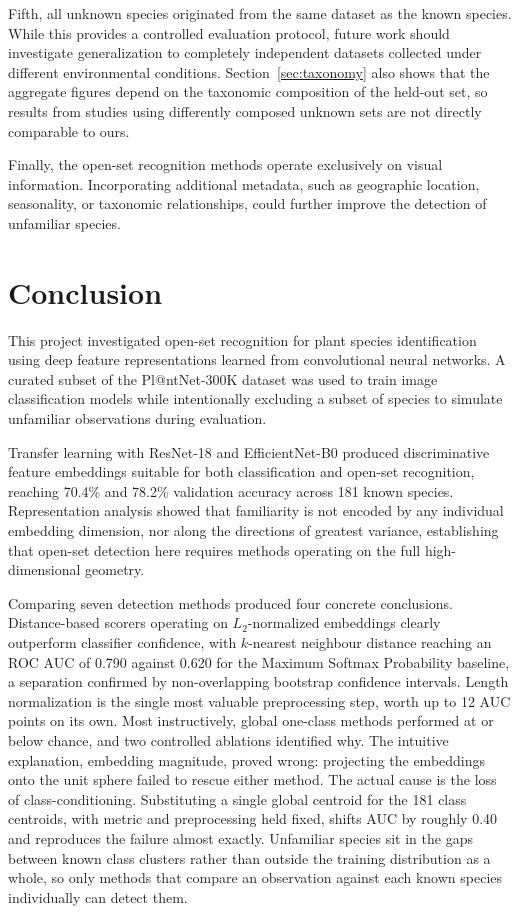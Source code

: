 \documentclass[11pt]{article}
\begin{document}
Fifth, all unknown species originated from the same dataset as the known species. While this provides a controlled evaluation protocol, future work should investigate generalization to completely independent datasets collected under different environmental conditions. Section~\ref{sec:taxonomy} also shows that the aggregate figures depend on the taxonomic composition of the held-out set, so results from studies using differently composed unknown sets are not directly comparable to ours.

Finally, the open-set recognition methods operate exclusively on visual information. Incorporating additional metadata, such as geographic location, seasonality, or taxonomic relationships, could further improve the detection of unfamiliar species.

\section{Conclusion}


This project investigated open-set recognition for plant species identification using deep feature representations learned from convolutional neural networks. A curated subset of the Pl@ntNet-300K dataset was used to train image classification models while intentionally excluding a subset of species to simulate unfamiliar observations during evaluation.

Transfer learning with ResNet-18 and EfficientNet-B0 produced discriminative feature embeddings suitable for both classification and open-set recognition, reaching 70.4\% and 78.2\% validation accuracy across 181 known species. Representation analysis showed that familiarity is not encoded by any individual embedding dimension, nor along the directions of greatest variance, establishing that open-set detection here requires methods operating on the full high-dimensional geometry.

Comparing seven detection methods produced four concrete conclusions. Distance-based scorers operating on $L_2$-normalized embeddings clearly outperform classifier confidence, with $k$-nearest neighbour distance reaching an ROC AUC of 0.790 against 0.620 for the Maximum Softmax Probability baseline, a separation confirmed by non-overlapping bootstrap confidence intervals. Length normalization is the single most valuable preprocessing step, worth up to 12 AUC points on its own. Most instructively, global one-class methods performed at or below chance, and two controlled ablations identified why. The intuitive explanation, embedding magnitude, proved wrong: projecting the embeddings onto the unit sphere failed to rescue either method. The actual cause is the loss of class-conditioning. Substituting a single global centroid for the 181 class centroids, with metric and preprocessing held fixed, shifts AUC by roughly 0.40 and reproduces the failure almost exactly. Unfamiliar species sit in the gaps between known class clusters rather than outside the training distribution as a whole, so only methods that compare an observation against each known species individually can detect them.
\end{document}
